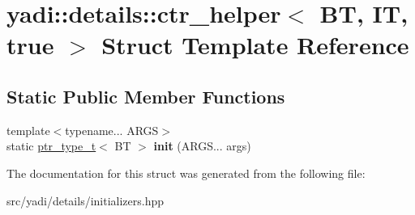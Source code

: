 \hypertarget{structyadi_1_1details_1_1ctr__helper_3_01_b_t_00_01_i_t_00_01true_01_4}{}\section{yadi\+:\+:details\+:\+:ctr\+\_\+helper$<$ BT, IT, true $>$ Struct Template Reference}
\label{structyadi_1_1details_1_1ctr__helper_3_01_b_t_00_01_i_t_00_01true_01_4}
\subsection*{Static Public Member Functions}
\begin{DoxyCompactItemize}
\item 
\mbox{\label{structyadi_1_1details_1_1ctr__helper_3_01_b_t_00_01_i_t_00_01true_01_4_a3c5dce230474dd7c1299bee33f9745af}} 
{\footnotesize template$<$typename... A\+R\+GS$>$ }\\static \hyperlink{namespaceyadi_a92290eb27cd90666aa87b17d854af9fe}{ptr\+\_\+type\+\_\+t}$<$ BT $>$ {\bfseries init} (A\+R\+G\+S... args)
\end{DoxyCompactItemize}


The documentation for this struct was generated from the following file\+:\begin{DoxyCompactItemize}
\item 
src/yadi/details/initializers.\+hpp\end{DoxyCompactItemize}
